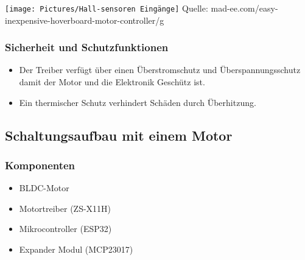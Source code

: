 \documentclass[ngerman,12pt,a4paper]{article}
\begin{document}
		\begin{minipage}{\textwidth}
			\centering
			\texttt{[image: Pictures/Hall-sensoren Eingänge]}
			\label{fig:spiffs_init}
			\vspace{-2pt}
			\small Quelle: mad-ee.com/easy-inexpensive-hoverboard-motor-controller/g
		\end{minipage}
		
		\subsubsection*{Sicherheit und Schutzfunktionen}
		\begin{itemize}
			\item Der Treiber verfügt über einen Überstromschutz und Überspannungsschutz damit der Motor und die Elektronik Geschütz ist.
			\item Ein thermischer Schutz verhindert Schäden durch Überhitzung.
		\end{itemize}
		\newpage
		\subsection{Schaltungsaufbau mit einem Motor} %
		
			\subsubsection{Komponenten}
			\begin{itemize}
				\item BLDC-Motor
				\item Motortreiber (ZS-X11H)
				\item Mikrocontroller (ESP32)
				\item Expander Modul (MCP23017)
			\end{itemize}
			
\end{document}
